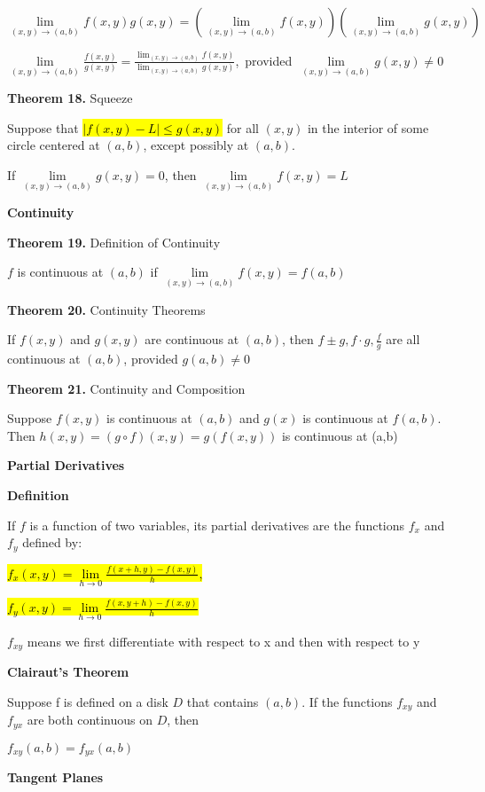 \documentclass{article}
\newcommand{\headingsmall}[1]{{\small\textbf{#1}}}
\begin{document}
\begin{multicols*}{4}
\mbox{$\lim\limits_{(x,y)\to(a,b)}f(x,y)g(x,y)=\left(\lim\limits_{(x,y)\to(a,b)}f(x,y)\right)\left(\lim\limits_{(x,y)\to(a,b)}g(x,y)\right)$}

\mbox{$\lim\limits_{(x,y)\to(a,b)}\frac{f(x,y)}{g(x,y)}=\frac{\lim_{(x,y)\to(a,b)}f(x,y)}{\lim_{(x,y)\to(a,b)}g(x,y)}$, provided $\lim\limits_{(x,y)\to(a,b)}g(x,y)\neq 0$}

\textbf{Theorem 18.} Squeeze

Suppose that \hl{$|f(x,y)-L|\leq g(x,y)$} for all $(x,y)$ in the interior of some circle centered at $(a,b)$, except possibly at $(a,b)$.

\centerline{If $\lim\limits_{(x,y)\to(a,b)}g(x,y)=0$, then $\lim\limits_{(x,y)\to(a,b)}f(x,y)=L$}

\headingsmall{Continuity}

\textbf{Theorem 19.} Definition of Continuity

$f$ is continuous at $(a,b)$ if $\lim\limits_{(x,y)\to(a,b)}f(x,y)=f(a,b)$

\textbf{Theorem 20.} Continuity Theorems

If $f(x,y)$ and $g(x,y)$ are continuous at $(a,b)$, then $f\pm g, f\cdot g, \frac{f}{g}$ are all continuous at $(a,b)$, provided $g(a,b)\neq 0$

\textbf{Theorem 21.} Continuity and Composition

Suppose $f(x,y)$ is continuous at $(a,b)$ and $g(x)$ is continuous at $f(a,b)$. Then $h(x,y) = (g\circ f)(x,y) = g(f(x,y))$ is continuous at (a,b)

\headingsmall{Partial Derivatives}

\textbf{Definition}

If $f$ is a function of two variables, its partial derivatives are the functions $f_x$ and $f_y$ defined by:

\centerline{\hl{$f_x(x,y)=\lim\limits_{h\to0}\frac{f(x+h,y)-f(x,y)}{h}$,}}
\centerline{\hl{$f_y(x,y)=\lim\limits_{h\to0}\frac{f(x,y+h)-f(x,y)}{h}$}}

$f_{xy}$ means we first differentiate with respect to x and then with respect to y

\textbf{Clairaut's Theorem}

Suppose f is defined on a disk $D$ that contains $(a,b)$. If the functions $f_{xy}$ and $f_{yx}$ are both continuous on $D$, then
\centerline{$f_{xy}(a,b)=f_{yx}(a,b)$}

\vfill\null
\columnbreak

\textbf{Tangent Planes}


\end{multicols*}
\end{document}
